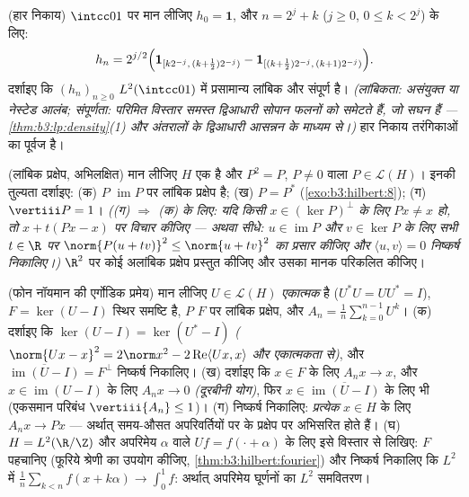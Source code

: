 \begin{exercise}[$\star\star\star$]\label{exo:b3:hilbert:10}
(हार निकाय) $\intcc01$ पर मान लीजिए $h_{0} = \mathbf 1$, और $n = 2^j + k$ ($j \geq 0$, $0 \leq k < 2^j$) के
लिए:
\[
h_n = 2^{j/2}\Bigl(\mathbf 1_{[k2^{-j},\,(k +
\frac12)2^{-j})} - \mathbf 1_{[(k+\frac12)2^{-j},\,(k+1)2^{-j})}
\Bigr).
\]
दर्शाइए कि $(h_n)_{n\geq0}$ $L^2(\intcc01)$ में प्रसामान्य लांबिक और संपूर्ण है।
\emph{(लांबिकता: असंयुक्त या नेस्टेड आलंब; संपूर्णता: परिमित विस्तार
समस्त द्विआधारी सोपान फलनों को समेटते हैं, जो सघन हैं --- \cref{thm:b3:lp:density}(1)
और अंतरालों के द्विआधारी आसन्नन के माध्यम से।)} हार निकाय
तरंगिकाओं का पूर्वज है।
\end{exercise}

\begin{exercise}[$\star\star$]\label{exo:b3:hilbert:11}
(लांबिक प्रक्षेप, अभिलक्षित) मान लीजिए $H$ एक  है
और $P^2 = P$, $P \neq 0$ वाला $P \in \mathcal L(H)$। इनकी तुल्यता दर्शाइए:
(क) $P$ $\operatorname{im}P$ पर लांबिक प्रक्षेप है;
(ख) $P = P^*$ (\cref{exo:b3:hilbert:8});
(ग) $\vertiii P = 1$।
\emph{((ग) $\Rightarrow$ (क) के लिए: यदि किसी $x \in
(\ker P)^\perp$ के लिए $Px \neq x$ हो, तो
$x + t(Px - x)$ पर विचार कीजिए --- अथवा सीधे: $u \in \operatorname{im}P$ और $v \in
\ker P$ के लिए सभी
$t \in \R$ पर $\norm{P(u + tv)}^2 \leq \norm{u + tv}^2$ का प्रसार कीजिए और $\langle u, v\rangle = 0$ निष्कर्ष निकालिए।)}
$\R^2$ पर कोई अलांबिक प्रक्षेप प्रस्तुत कीजिए और उसका मानक परिकलित
कीजिए।
\end{exercise}

\begin{exercise}[$\star\star\star$]\label{exo:b3:hilbert:12}
(फोन नॉयमान की एर्गोडिक प्रमेय) मान लीजिए $U \in \mathcal L(H)$ \emph{एकात्मक}
है ($U^*U = UU^* = I$), $F = \ker(U - I)$ स्थिर समष्टि है, $P$ $F$ पर लांबिक प्रक्षेप,
और $A_n = \frac1n\sum_{k=0}^{n-1}U^k$।
(क) दर्शाइए कि $\ker(U - I) = \ker(U^* - I)$ \emph{($\norm{Ux - x}^2 = 2\norm x^2 - 2\operatorname{Re}\langle
Ux, x\rangle$ और एकात्मकता से)}, और $\overline{\operatorname{im}(U - I)} = F^\perp$
निष्कर्ष निकालिए।
(ख) दर्शाइए कि $x \in F$ के लिए $A_nx \to x$, और $x \in \operatorname{im}(U - I)$ के लिए $A_nx \to 0$
\emph{(दूरबीनी योग)}, फिर $x \in \overline{\operatorname{im}(U - I)}$ के लिए भी (एकसमान परिबंध $\vertiii{A_n} \leq 1$)।
(ग) निष्कर्ष निकालिए: \emph{प्रत्येक} $x \in H$ के लिए $A_nx \to Px$ ---
अर्थात् समय-औसत अपरिवर्तियों पर के प्रक्षेप पर अभिसरित होते हैं।
(घ) $H = L^2(\R/\Z)$ और अपरिमेय $\alpha$ वाले $Uf = f(\cdot +
\alpha)$ के लिए इसे विस्तार से लिखिए:
$F$ पहचानिए (फूरिये श्रेणी का उपयोग कीजिए, \cref{thm:b3:hilbert:fourier}) और निष्कर्ष
निकालिए कि $L^2$ में $\frac1n\sum_{k<n}f(x + k\alpha) \to \int_0^1f$: अर्थात् अपरिमेय घूर्णनों का $L^2$
समवितरण।
\end{exercise}

